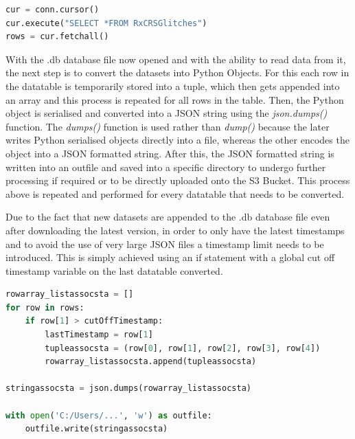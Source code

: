 \begin{lstlisting}[language=Python, caption={SQLite3 Cursor Object and Its Execute and Fetchall Method Code Snippet}, label={lst:Cursor Object}]
cur = conn.cursor()
cur.execute("SELECT *FROM RxCRSGlitches")
rows = cur.fetchall()
\end{lstlisting}

With the .db database file now opened and with the ability to read data from it, the next step is to convert the datasets into Python Objects. For this each row in the datatable is temporarily stored into a tuple, which then gets appended into an array and this process is repeated for all rows in the table. Then, the Python object is serialised and converted into a JSON string using the \textit{json.dumps()} function. The \textit{dumps()} function is used rather than \textit{dump()} because the later writes Python serialised objects directly into a file, whereas the other encodes the object into a JSON formatted string. After this, the JSON formatted string is written into an outfile and saved into a specific directory to undergo further processing if required or to be directly uploaded onto the S3 Bucket. This process above is repeated and performed for every datatable that needs to be converted. 

Due to the fact that new datasets are appended to the .db database file even after downloading the latest version, in order to only have the latest timestamps and to avoid the use of very large JSON files a timestamp limit needs to be introduced. This is simply achieved using an if statement with a global cut off timestamp variable on the last datatable converted. 

\begin{lstlisting}[language=Python, caption={JSON Conversion Code Snippet}, label={lst:conversion example}]
rowarray_listassocsta = []
for row in rows:
    if row[1] > cutOffTimestamp:
        lastTimestamp = row[1]
        tupleassocsta = (row[0], row[1], row[2], row[3], row[4])
        rowarray_listassocsta.append(tupleassocsta)
            
stringassocsta = json.dumps(rowarray_listassocsta)

with open('C:/Users/...', 'w') as outfile:
    outfile.write(stringassocsta)
\end{lstlisting}

